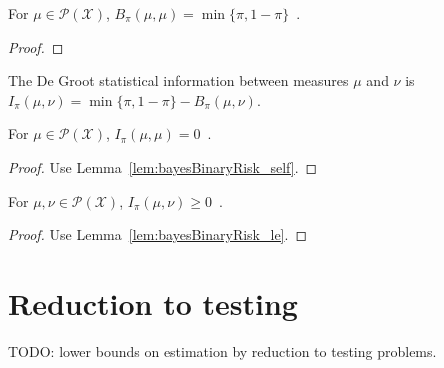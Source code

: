 \begin{lemma}
  \label{lem:bayesBinaryRisk_self}
  For $\mu \in \mathcal P(\mathcal X)$, $B_\pi(\mu, \mu) = \min\{\pi, 1-\pi\}$~.
\end{lemma}

\begin{proof}%
\uses{}
\end{proof}

\begin{definition}
  \label{def:deGrootInfo}
  The De Groot statistical information between measures $\mu$ and $\nu$ is $I_\pi(\mu, \nu) = \min\{\pi, 1 - \pi\} - B_\pi(\mu, \nu)$.
\end{definition}

\begin{lemma}
  \label{lem:deGrootInfo_self}
  For $\mu \in \mathcal P(\mathcal X)$, $I_\pi(\mu, \mu) = 0$~.
\end{lemma}

\begin{proof}%
{}
Use Lemma~\ref{lem:bayesBinaryRisk_self}.
\end{proof}

\begin{lemma}
  \label{lem:deGrootInfo_nonneg}
  For $\mu, \nu \in \mathcal P(\mathcal X)$, $I_\pi(\mu, \nu) \ge 0$~.
\end{lemma}

\begin{proof}%
{}
Use Lemma~\ref{lem:bayesBinaryRisk_le}.
\end{proof}

\section{Reduction to testing}

TODO: lower bounds on estimation by reduction to testing problems.